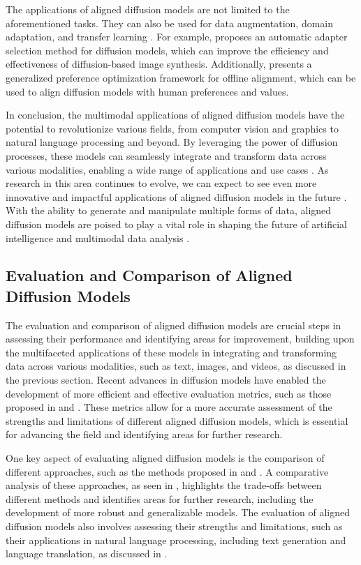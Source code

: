 \documentclass[11pt,a4paper]{article}
\begin{document}
The applications of aligned diffusion models are not limited to the aforementioned tasks. They can also be used for data augmentation, domain adaptation, and transfer learning \cite{arxiv:2502.06805}. For example, \cite{arxiv:2404.18928} proposes an automatic adapter selection method for diffusion models, which can improve the efficiency and effectiveness of diffusion-based image synthesis. Additionally, \cite{arxiv:2402.05749} presents a generalized preference optimization framework for offline alignment, which can be used to align diffusion models with human preferences and values.

In conclusion, the multimodal applications of aligned diffusion models have the potential to revolutionize various fields, from computer vision and graphics to natural language processing and beyond. By leveraging the power of diffusion processes, these models can seamlessly integrate and transform data across various modalities, enabling a wide range of applications and use cases \cite{arxiv:2502.10458}. As research in this area continues to evolve, we can expect to see even more innovative and impactful applications of aligned diffusion models in the future \cite{arxiv:2508.06592}. With the ability to generate and manipulate multiple forms of data, aligned diffusion models are poised to play a vital role in shaping the future of artificial intelligence and multimodal data analysis \cite{arxiv:2503.14504}.


\subsection{Evaluation and Comparison of Aligned Diffusion Models}


The evaluation and comparison of aligned diffusion models are crucial steps in assessing their performance and identifying areas for improvement, building upon the multifaceted applications of these models in integrating and transforming data across various modalities, such as text, images, and videos, as discussed in the previous section. Recent advances in diffusion models have enabled the development of more efficient and effective evaluation metrics, such as those proposed in \cite{doi:10.1109/tpami.2023.3261988} and \cite{arxiv:2502.06805}. These metrics allow for a more accurate assessment of the strengths and limitations of different aligned diffusion models, which is essential for advancing the field and identifying areas for further research.

One key aspect of evaluating aligned diffusion models is the comparison of different approaches, such as the methods proposed in \cite{doi:10.18653/v1/d19-1453} and \cite{arxiv:2404.03653}. A comparative analysis of these approaches, as seen in \cite{doi:10.1109/tkde.2024.3361474}, highlights the trade-offs between different methods and identifies areas for further research, including the development of more robust and generalizable models. The evaluation of aligned diffusion models also involves assessing their strengths and limitations, such as their applications in natural language processing, including text generation and language translation, as discussed in \cite{arxiv:2303.07576}.
\end{document}
